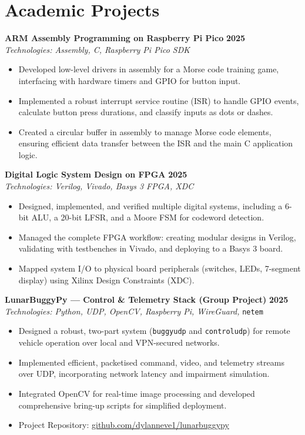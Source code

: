 \documentclass[10pt,a4paper]{article}
\begin{document}
\section*{Academic Projects}
\textbf{ARM Assembly Programming on Raspberry Pi Pico} \hfill \textbf{2025} \\
\textit{Technologies: Assembly, C, Raspberry Pi Pico SDK}
\begin{itemize}
    \item Developed low-level drivers in assembly for a Morse code training game, interfacing with hardware timers and GPIO for button input.
    \item Implemented a robust interrupt service routine (ISR) to handle GPIO events, calculate button press durations, and classify inputs as dots or dashes.
    \item Created a circular buffer in assembly to manage Morse code elements, ensuring efficient data transfer between the ISR and the main C application logic.
\end{itemize}
\medskip
\textbf{Digital Logic System Design on FPGA} \hfill \textbf{2025} \\
\textit{Technologies: Verilog, Vivado, Basys 3 FPGA, XDC}
\begin{itemize}
    \item Designed, implemented, and verified multiple digital systems, including a 6-bit ALU, a 20-bit LFSR, and a Moore FSM for codeword detection.
    \item Managed the complete FPGA workflow: creating modular designs in Verilog, validating with testbenches in Vivado, and deploying to a Basys 3 board.
    \item Mapped system I/O to physical board peripherals (switches, LEDs, 7-segment display) using Xilinx Design Constraints (XDC).
\end{itemize}
\medskip
\textbf{LunarBuggyPy --- Control \& Telemetry Stack (Group Project)} \hfill \textbf{2025} \\
\textit{Technologies: Python, UDP, OpenCV, Raspberry Pi, WireGuard,} \texttt{netem}
\begin{itemize}
    \item Designed a robust, two-part system (\texttt{buggyudp} and \texttt{controludp}) for remote vehicle operation over local and VPN-secured networks.
    \item Implemented efficient, packetised command, video, and telemetry streams over UDP, incorporating network latency and impairment simulation.
    \item Integrated OpenCV for real-time image processing and developed comprehensive bring-up scripts for simplified deployment.
    \item Project Repository: \href{https://github.com/dylanneve1/lunarbuggypy}{github.com/dylanneve1/lunarbuggypy}
\end{itemize}
\end{document}
